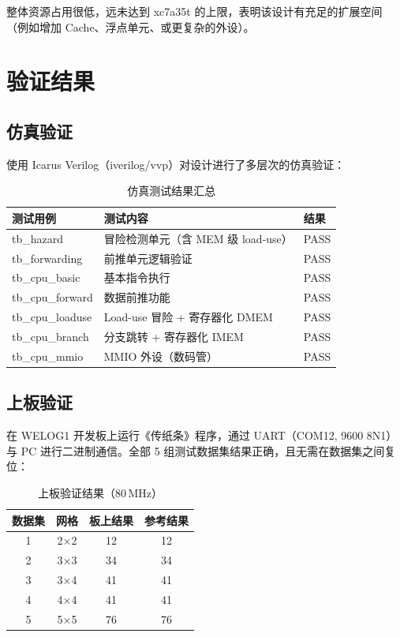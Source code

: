 \documentclass[12pt,a4paper]{ctexart}
\begin{document}
整体资源占用很低，远未达到 xc7a35t 的上限，表明该设计有充足的扩展空间
（例如增加 Cache、浮点单元、或更复杂的外设）。

\section{验证结果}

\subsection{仿真验证}

使用 Icarus Verilog（iverilog/vvp）对设计进行了多层次的仿真验证：

\begin{table}[H]
\centering
\caption{仿真测试结果汇总}
\begin{tabular}{@{}lll@{}}
\toprule
\textbf{测试用例} & \textbf{测试内容} & \textbf{结果} \\
\midrule
tb\_hazard        & 冒险检测单元（含 MEM 级 load-use） & PASS \\
tb\_forwarding    & 前推单元逻辑验证                     & PASS \\
tb\_cpu\_basic    & 基本指令执行                         & PASS \\
tb\_cpu\_forward  & 数据前推功能                         & PASS \\
tb\_cpu\_loaduse  & Load-use 冒险 + 寄存器化 DMEM       & PASS \\
tb\_cpu\_branch   & 分支跳转 + 寄存器化 IMEM            & PASS \\
tb\_cpu\_mmio     & MMIO 外设（数码管）                  & PASS \\
\bottomrule
\end{tabular}
\label{tab:sim}
\end{table}

\subsection{上板验证}

在 WELOG1 开发板上运行《传纸条》程序，通过 UART（COM12, 9600 8N1）
与 PC 进行二进制通信。全部 5 组测试数据集结果正确，且无需在数据集之间复位：

\begin{table}[H]
\centering
\caption{上板验证结果（80\,MHz）}
\begin{tabular}{@{}cccc@{}}
\toprule
\textbf{数据集} & \textbf{网格} & \textbf{板上结果} & \textbf{参考结果} \\
\midrule
1 & 2×2 & 12 & 12 \\
2 & 3×3 & 34 & 34 \\
3 & 3×4 & 41 & 41 \\
4 & 4×4 & 41 & 41 \\
5 & 5×5 & 76 & 76 \\
\bottomrule
\end{tabular}
\label{tab:board}
\end{table}
\end{document}

